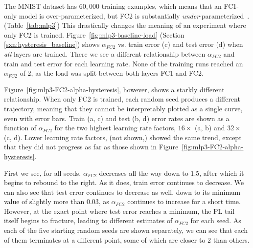 The MNIST dataset has $60,000$ training examples, which means that an FC1-only model is over-parameterized, but FC2 is 
substantially \emph{under}-parameterized~\cite{DLM19_Exact_TR}. (Table~\ref{tab:mlp3}) This drastically changes the 
meaning of an experiment where only FC2 is trained. Figure~\ref{fig:mlp3-baseline-load} (Section 
\ref{sxn:hysteresis_baseline}) shows $\alpha_{FC2}$ vs. train error (c) and test error (d) when \emph{all} layers are 
trained. There we see a different relationship between $\alpha_{FC2}$ and train and test error for each learning rate. 
None of the training runs reached an $\alpha_{FC2}$ of $2$, as the load was split between both layers FC1 and FC2.

Figure~\ref{fig:mlp3-FC2-alpha-hysteresis}, however, shows a starkly different relationship. 
When only FC2 is trained, 
each random seed produces a different trajectory, meaning that they cannot be interpretably plotted as a single curve, even with error 
bars. Train (a, c) and test (b, d) error rates are shown as a function of $\alpha_{FC2}$ for the two highest learning 
rate factors, $16\times$ (a, b) and $32\times$ (c, d). Lower learning rate factors, (not shown,) showed the same trend, except 
that they did not progress as far as those shown in Figure~\ref{fig:mlp3-FC2-alpha-hysteresis}.

First we see, for all seeds, $\alpha_{FC2}$ decreases all the way down to $1.5$, after which it begins to rebound to the 
right. As it 
does, train error continues to decrease. We can also see that test error continues to decrease as well, down to its minimum 
value of slightly more than $0.03$, as $\alpha_{FC2}$ continues to increase for a short time. However, at the exact 
point where test error reaches a minimum, the PL tail itself begins to fracture, leading to different estimates 
of $\alpha_{FC2}$ for each seed. As each of the five starting random seeds are shown separately, we can see that each of 
them terminates at a different point, some of which are closer to $2$ than others.

